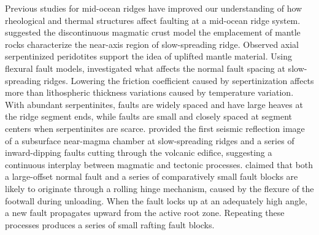 \documentclass[letterpaper,12pt,notitle]{memphisthesis}                     %
\begin{document}
Previous studies for mid-ocean ridges have improved our understanding of how rheological and thermal structures affect faulting at a mid-ocean ridge system.
\citet{Cannat1993} suggested the discontinuous magmatic crust model the emplacement of mantle rocks characterize the near-axis region of slow-spreading ridge. Observed axial serpentinized peridotites support the idea of uplifted mantle material. Using flexural fault models, \citet{Escartin1997} investigated what affects the normal fault spacing at slow-spreading ridges. Lowering the friction coefficient caused by sepertinization affects more than lithospheric thickness variations caused by temperature variation. With abundant serpentinites, faults are widely spaced and have large heaves at the ridge segment ends, while faults are small and closely spaced at segment centers when serpentinites are scarce. \citet{Singh2006} provided the first seismic reflection image of a subsurface near-magma chamber at slow-spreading ridges and a series of inward-dipping faults cutting through the volcanic edifice, suggesting a continuous interplay between magmatic and tectonic processes. \citet{Reston2011} claimed that both a large-offset normal fault and a series of comparatively small fault blocks are likely to originate through a rolling hinge mechanism, caused by the flexure of the footwall during unloading. When the fault locks up at an adequately high angle, a new fault propagates upward from the active root zone. Repeating these processes produces a series of small rafting fault blocks.
\end{document}
